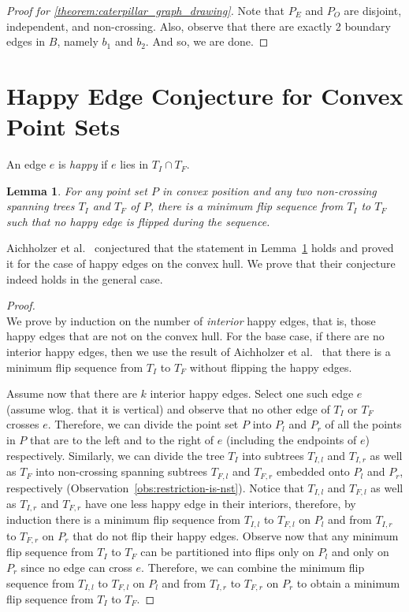 \documentclass{article}
\newtheorem{lemma}[theorem]{Lemma}
\begin{document}
\begin{proof}[Proof for \ref{theorem:caterpillar_graph_drawing}]
	Note that $P_E$ and $P_O$ are disjoint, independent, and non-crossing. Also, observe that there are exactly 2 boundary edges in $B$, namely $b_1$ and $b_2$. And so, we are done.
\end{proof}

\section{Happy Edge Conjecture for Convex Point Sets}

An edge $e$ is \emph{happy} if
$e$ lies in $T_I \cap T_F$.

\begin{lemma} %
	\label{lem:happy-edge}
	For any point set $P$ in convex position and any two non-crossing spanning trees $T_I$ and $T_F$ of $P$, there is a minimum flip sequence from $T_I$ to $T_F$ such that
	no happy edge is flipped during the sequence.
\end{lemma}

Aichholzer et al.~\cite{aichholzer-arxiv-2024}
conjectured that the statement in Lemma~\ref{lem:happy-edge} holds and
proved it for the case of happy edges on the convex hull. We prove that their conjecture indeed holds in the general case.
\begin{proof}
	$ $ \\
	We prove by induction on the number of \emph{interior} happy edges, that is, those happy edges that are not on the convex hull.
	For the base case, if there are no interior happy edges, then we use the result of Aichholzer et al.~\cite{aichholzer-arxiv-2024}
	that there is a minimum flip sequence from $T_I$ to $T_F$ without flipping the happy edges.

	Assume now that there are $k$ interior happy edges. Select one such edge $e$ (assume wlog. that it is vertical)
	and observe that no other edge of $T_I$ or $T_F$ crosses $e$.
	Therefore, we can divide the point set $P$ into $P_l$ and $P_r$
	of all the points in $P$ that are to
	the left and to the right of $e$ (including the endpoints of $e$) respectively.
	Similarly, we can divide the tree $T_I$ into subtrees $T_{I,l}$
	and $T_{I,r}$ as well as $T_F$ into non-crossing spanning subtrees $T_{F, l}$ and $T_{F, r}$ embedded onto $P_l$ and $P_r$, respectively (Observation~\ref{obs:restriction-is-nst}).
	Notice that $T_{I,l}$ and $T_{F, l}$ as well as $T_{I, r}$ and $T_{F, r}$ have one less happy edge in their interiors, therefore, by induction
	there is a minimum flip sequence from $T_{I,l}$ to $T_{F, l}$ on $P_l$ and  from $T_{I,r}$ to $T_{F, r}$ on $P_r$ that do not flip their happy edges.
	Observe now that any minimum flip sequence from $T_{I}$ to $T_{F}$ can be partitioned into flips  only on $P_l$ and only on $P_r$
	since no edge can cross $e$. Therefore, we can combine the minimum flip sequence from $T_{I,l}$ to $T_{F, l}$ on $P_l$ and from $T_{I,r}$ to $T_{F, r}$ on $P_r$
	to obtain a minimum flip sequence from $T_{I}$ to $T_{F}$.
\end{proof}
\end{document}
